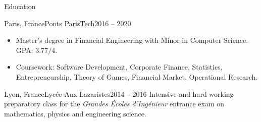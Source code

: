 \documentclass[]{mcdowellcv}
\begin{document}
    \begin{cvsection}{Education}

        \begin{cvsubsection}{Paris, France}{Ponts ParisTech}{2016 -- 2020}
            \begin{itemize}
                \item Master's degree in Financial Engineering with Minor in Computer Science. GPA: \(3.77 / 4\).
                \item Coursework: Software Development, Corporate Finance, Statistics, Entrepreneurship, Theory of Games, Financial Market, Operational Research.
            \end{itemize}
        \end{cvsubsection}

        \begin{cvsubsection}{Lyon, France}{Lyc\'ee Aux Lazaristes}{2014 -- 2016}
            Intensive and hard working preparatory class for the \textit{Grandes \'Ecoles d'Ing\'enieur} entrance exam on mathematics, physics and engineering science.
        \end{cvsubsection}

    \end{cvsection}
\end{document}
